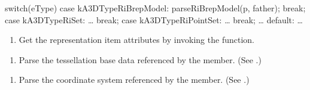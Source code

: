 \documentclass[letterpaper,12pt,english,openany,oneside]{sphinxmanual}
\begin{document}
\begin{sphinxVerbatim}[commandchars=\\\{\}]
switch(eType) \PYGZob{}
case kA3DTypeRiBrepModel:
  parseRiBrepModel(p, father);
  break;
case kA3DTypeRiSet:
  …
  break;
case kA3DTypeRiPointSet:
  …
  break;
…
default:
  …
\PYGZcb{}
\end{sphinxVerbatim}
\begin{enumerate}
%
\setcounter{enumi}{4}
\item {} 
Get the representation item attributes by invoking the  function.

\end{enumerate}

\begin{sphinxVerbatim}[commandchars=\\\{\}]
 
   
\end{sphinxVerbatim}
\begin{enumerate}
%
\setcounter{enumi}{5}
\item {} 
Parse the tessellation base data referenced by the  member. (See .)

\end{enumerate}

\begin{sphinxVerbatim}[commandchars=\\\{\}]
  
\end{sphinxVerbatim}
\begin{enumerate}
%
\setcounter{enumi}{6}
\item {} 
Parse the coordinate system referenced by the  member. (See .)

\end{enumerate}
\end{document}
